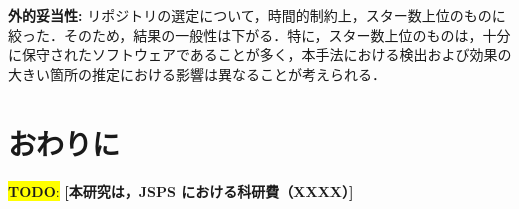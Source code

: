 \documentclass[submit,techrep,noauthor]{ipsj}
\newcommand{\todo}[1]{\colorbox{yellow}{{\bf TODO}:}{\color{red} {\textbf{[#1]}}}}
\begin{document}
\noindent\textbf{外的妥当性: }
リポジトリの選定について，時間的制約上，スター数上位のものに絞った．そのため，結果の一般性は下がる．特に，スター数上位のものは，十分に保守されたソフトウェアであることが多く，本手法における検出および効果の大きい箇所の推定における影響は異なることが考えられる．

\section{おわりに}
\label{sec:summary}

\begin{acknowledgment}
\todo{本研究は，JSPS における科研費（XXXX）}
\end{acknowledgment}





\end{document}
